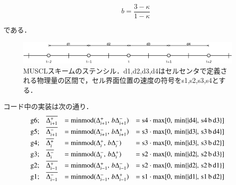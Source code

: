 \[
\hspace{1cm} b = \frac{3-\kappa}{1-\kappa}
\]

\noindent である．

\begin{figure}[htbp]
\begin{center}
\includegraphics[width=15cm,clip]{muscl_stencil.eps}
\end{center}
\caption{MUSCLスキームのステンシル．d1,d2,d3,d4はセルセンタで定義される物理量の区間で，セル界面位置の速度の符号をs1,s2,s3,s4とする．}
\label{fig:muscl_stencil}
\end{figure}

コード中の実装は次の通り．
\[
\begin{array}{llll}
\vspace{1mm}
\mathrm{g6}; & \overline{\Delta^+_{i+1}} & = \mathrm{minmod}(\Delta^+_{i+1},\,b\Delta^-_{i+1}) & = \mathrm{s4} \cdot \mathrm{max}[0,\,\mathrm{min}\{ |\mathrm{d4}|,\, \mathrm{s4\,b\,d3}\} ] \\
\vspace{1mm}
\mathrm{g5}; & \overline{\Delta^-_{i+1}} & = \mathrm{minmod}(\Delta^-_{i+1},\,b\Delta^+_{i+1}) & = \mathrm{s3} \cdot \mathrm{max}[0,\,\mathrm{min}\{ |\mathrm{d3}|,\, \mathrm{s3\,b\,d4}\} ] \\
\vspace{1mm}
\mathrm{g4}; & \overline{\Delta^+_{i}} & = \mathrm{minmod}(\Delta^+_{i},\,b\Delta^-_{i}) & = \mathrm{s3} \cdot \mathrm{max}[0,\,\mathrm{min}\{ |\mathrm{d3}|,\, \mathrm{s3\,b\,d2}\} ] \\
\vspace{1mm}
\mathrm{g3}; & \overline{\Delta^-_{i}} & = \mathrm{minmod}(\Delta^-_{i},\,b\Delta^+_{i}) & = \mathrm{s2} \cdot \mathrm{max}[0,\,\mathrm{min}\{ |\mathrm{d2}|,\, \mathrm{s2\,b\,d3}\} ] \\
\vspace{1mm}
\mathrm{g2}; & \overline{\Delta^+_{i-1}} & = \mathrm{minmod}(\Delta^+_{i-1},\,b\Delta^-_{i-1}) & = \mathrm{s2} \cdot \mathrm{max}[0,\,\mathrm{min}\{ |\mathrm{d2}|,\, \mathrm{s2\,b\,d1}\} ] \\
\vspace{1mm}
\mathrm{g1}; & \overline{\Delta^-_{i-1}} & = \mathrm{minmod}(\Delta^-_{i-1},\,b\Delta^+_{i-1}) & = \mathrm{s1} \cdot \mathrm{max}[0,\,\mathrm{min}\{ |\mathrm{d1}|,\, \mathrm{s1\,b\,d2}\} ] \\
\end{array}
\]

